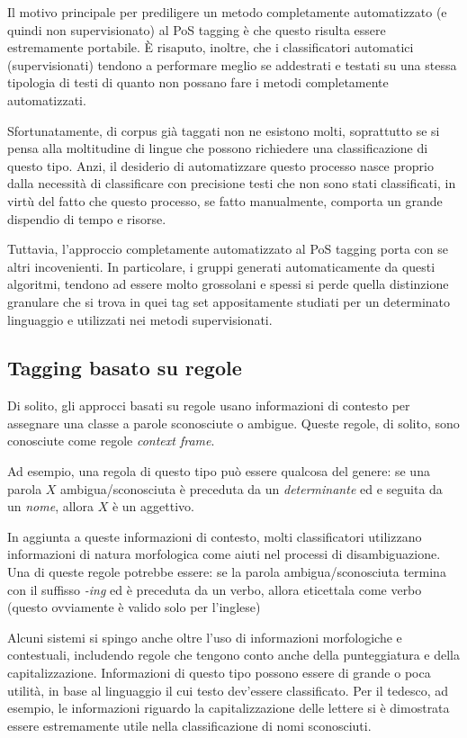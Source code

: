 Il motivo principale per prediligere un metodo completamente automatizzato (e
quindi non supervisionato) al PoS tagging \`e che questo risulta essere estremamente
portabile. \`E risaputo, inoltre, che i classificatori automatici (supervisionati)
tendono a performare meglio se addestrati e testati su una stessa tipologia di
testi di quanto non possano fare i metodi completamente automatizzati.

Sfortunatamente, di corpus gi\`a taggati non ne esistono molti, soprattutto se
si pensa alla moltitudine di lingue che possono richiedere una classificazione
di questo tipo. Anzi, il desiderio di automatizzare questo processo nasce proprio
dalla necessit\`a di classificare con precisione testi che non sono stati classificati,
in virt\`u del fatto che questo processo, se fatto manualmente, comporta un grande
dispendio di tempo e risorse.

Tuttavia, l'approccio completamente automatizzato al PoS tagging porta con se
altri incovenienti. In particolare, i gruppi generati automaticamente da questi
algoritmi, tendono ad essere molto grossolani e spessi si perde quella distinzione
granulare che si trova in quei tag set appositamente studiati per un determinato
linguaggio e utilizzati nei metodi supervisionati.

\subsection{Tagging basato su regole}
\nocite{Brill:1992}
\nocite{Greene:1971}

Di solito, gli approcci basati su regole usano informazioni di contesto per
assegnare una classe a parole sconosciute o ambigue. Queste regole, di solito,
sono conosciute come regole \emph{context frame}.

Ad esempio, una regola di questo tipo pu\`o essere qualcosa del genere: se una
parola $X$ ambigua/sconosciuta \`e preceduta da un \emph{determinante} ed e
seguita da un \emph{nome}, allora $X$ \`e un aggettivo.

In aggiunta a queste informazioni di contesto, molti classificatori utilizzano
informazioni di natura morfologica come aiuti nel processi di disambiguazione.
Una di queste regole potrebbe essere: se la parola ambigua/sconosciuta termina
con il suffisso \emph{-ing} ed \`e preceduta da un verbo, allora eticettala come
verbo (questo ovviamente \`e valido solo per l'inglese)

Alcuni sistemi si spingo anche oltre l'uso di informazioni morfologiche e contestuali,
includendo regole che tengono conto anche della punteggiatura e della capitalizzazione.
Informazioni di questo tipo possono essere di grande o poca utilit\`a, in base
al linguaggio il cui testo dev'essere classificato. Per il tedesco, ad esempio,
le informazioni riguardo la capitalizzazione delle lettere si \`e dimostrata
essere estremamente utile nella classificazione di nomi sconosciuti.

